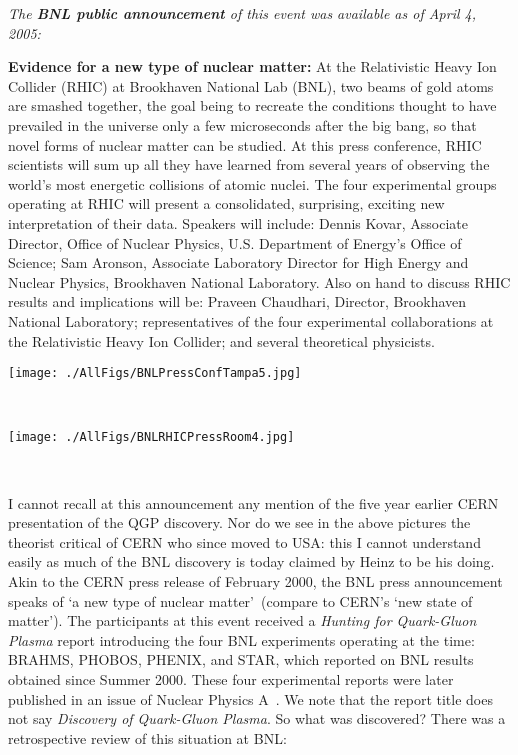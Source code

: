 \noindent \textit{The \textbf{BNL public announcement} of this event was available as of April 4, 2005:}\\[-0.7cm]
%
\begin{mdframed}[linecolor=gray,roundcorner=12pt,backgroundcolor=GreenYellow!15,linewidth=1pt,leftmargin=0cm,rightmargin=0cm,topline=true,bottomline=true,skipabove=12pt]\relax%
%
\textbf{Evidence for a new type of nuclear matter:}\label{RHIC2005}
At the Relativistic Heavy Ion Collider (RHIC) at Brookhaven National Lab (BNL), two beams of gold atoms are smashed together, the goal being to recreate the conditions thought to have prevailed in the universe only a few microseconds after the big bang, so that novel forms of nuclear matter can be studied. At this press conference, RHIC scientists will sum up all they have learned from several years of observing the world’s most energetic collisions of atomic nuclei. The four experimental groups operating at RHIC will present a consolidated, surprising, exciting new interpretation of their data. Speakers will include: Dennis Kovar, Associate Director, Office of Nuclear Physics, U.S. Department of Energy's Office of Science; Sam Aronson, Associate Laboratory Director for High Energy and Nuclear Physics, Brookhaven National Laboratory. Also on hand to discuss RHIC results and implications will be: Praveen Chaudhari, Director, Brookhaven National Laboratory; representatives of the four experimental collaborations at the Relativistic Heavy Ion Collider; and several theoretical physicists.\\

\centerline{\texttt{[image: ./AllFigs/BNLPressConfTampa5.jpg]}}
\vskip-35pt\phantom{.}\hfil {}\\
\centerline{\texttt{[image: ./AllFigs/BNLRHICPressRoom4.jpg]}}
\vskip-24pt\phantom{.}\hfil{\color{yellow}{\small Photo: J. Rafelski}}\\
\end{mdframed}
\vskip 0.5cm

I cannot recall at this announcement any mention of the five year earlier CERN presentation of the QGP discovery. Nor do we see in the above pictures the theorist critical of CERN who since moved to USA: this I cannot understand easily as much of the BNL discovery is today claimed by Heinz to be his doing. Akin to the CERN press release of February 2000, the BNL press announcement speaks of \lq a new type of nuclear matter\rq\ (compare to CERN\rq s \lq new state of matter\rq). The participants at this event received a \textit{Hunting for Quark-Gluon Plasma} report introducing the four BNL experiments operating at the time: BRAHMS, PHOBOS, PHENIX, and STAR, which reported on BNL results obtained since Summer 2000. These four experimental reports were later published in an issue of Nuclear Physics A~\cite{Arsene:2004faB,Adcox:2004mhB,Back:2004jeB,Adams:2005dqB}. We note that the report title does not say \textit{Discovery of Quark-Gluon Plasma}. So what was discovered? There was a retrospective review of this situation at BNL:\\ 

